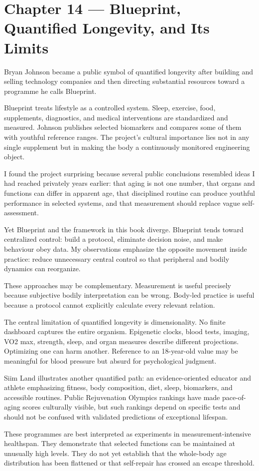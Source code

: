 \chapter{Chapter 14 --- Blueprint, Quantified Longevity, and Its Limits}\label{chapter-14-blueprint-quantified-longevity-and-its-limits}

Bryan Johnson became a public symbol of quantified longevity after building and selling technology companies and then directing substantial resources toward a programme he calls Blueprint.

Blueprint treats lifestyle as a controlled system. Sleep, exercise, food, supplements, diagnostics, and medical interventions are standardized and measured. Johnson publishes selected biomarkers and compares some of them with youthful reference ranges. The project's cultural importance lies not in any single supplement but in making the body a continuously monitored engineering object.

I found the project surprising because several public conclusions resembled ideas I had reached privately years earlier: that aging is not one number, that organs and functions can differ in apparent age, that disciplined routine can produce youthful performance in selected systems, and that measurement should replace vague self-assessment.

Yet Blueprint and the framework in this book diverge. Blueprint tends toward centralized control: build a protocol, eliminate decision noise, and make behaviour obey data. My observations emphasize the opposite movement inside practice: reduce unnecessary central control so that peripheral and bodily dynamics can reorganize.

These approaches may be complementary. Measurement is useful precisely because subjective bodily interpretation can be wrong. Body-led practice is useful because a protocol cannot explicitly calculate every relevant relation.

The central limitation of quantified longevity is dimensionality. No finite dashboard captures the entire organism. Epigenetic clocks, blood tests, imaging, VO2 max, strength, sleep, and organ measures describe different projections. Optimizing one can harm another. Reference to an 18-year-old value may be meaningful for blood pressure but absurd for psychological judgment.

Siim Land illustrates another quantified path: an evidence-oriented educator and athlete emphasizing fitness, body composition, diet, sleep, biomarkers, and accessible routines. Public Rejuvenation Olympics rankings have made pace-of-aging scores culturally visible, but such rankings depend on specific tests and should not be confused with validated predictions of exceptional lifespan.

These programmes are best interpreted as experiments in measurement-intensive healthspan. They demonstrate that selected functions can be maintained at unusually high levels. They do not yet establish that the whole-body age distribution has been flattened or that self-repair has crossed an escape threshold.

